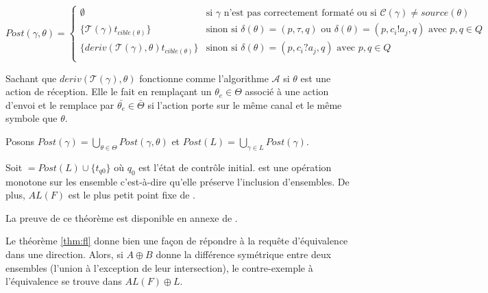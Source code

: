 $$
Post(\gamma,\theta) = \left\{ \begin{array}{ll}
    \emptyset & \text{si } \gamma \text{ n'est pas correctement formaté ou si } \mathcal{C}(\gamma)\neq source(\theta)\\
    \{\mathcal{T}(\gamma)t_{cible(\theta)}\} & \text{sinon si }\delta(\theta)=(p,\tau,q) \text{ ou } \delta(\theta)=(p,c_i!a_j,q) \text{ avec }p,q\in Q\\
    \{deriv(\mathcal{T}(\gamma),\theta)t_{cible(\theta)}\}& \text{sinon si } \delta(\theta)=(p,c_i?a_j,q) \text{ avec }p,q\in Q \\
    \end{array} \right.
$$

Sachant que $deriv(\mathcal{T}(\gamma),\theta)$ fonctionne comme l'algorithme $\mathcal{A}$ si $\theta$ est une action de réception. Elle le fait en remplaçant un $\theta_e \in \Theta$ associé à une action d'envoi et le remplace par $\bar{\theta_e} \in \bar{\Theta}$ si l'action porte sur le même canal et le même symbole que $\theta$.

Posons $Post(\gamma)=\bigcup_{\theta\in\Theta}Post(\gamma,\theta)$ et $Post(L)=\bigcup_{\gamma\in L}Post(\gamma)$.


\begin{theorem}\label{thm:fl}
  Soit \fl$=Post(L)\cup\{t_{q0}\}$ où $q_0$ est l'état de contrôle initial. \fl est une opération monotone sur les ensemble c'est-à-dire qu'elle préserve l'inclusion d'ensembles. De plus, $AL(F)$ est le plus petit point fixe de \fl.
\end{theorem}

La preuve de ce théorème est disponible en annexe de \cite{Vardhan04}.

Le théorème \ref{thm:fl} donne bien une façon de répondre à la requête d'équivalence dans une direction. Alors, si $A\oplus B$ donne la différence symétrique entre deux ensembles (l'union à l'exception de leur intersection), le contre-exemple à l'équivalence se trouve dans $AL(F)\oplus L$.

